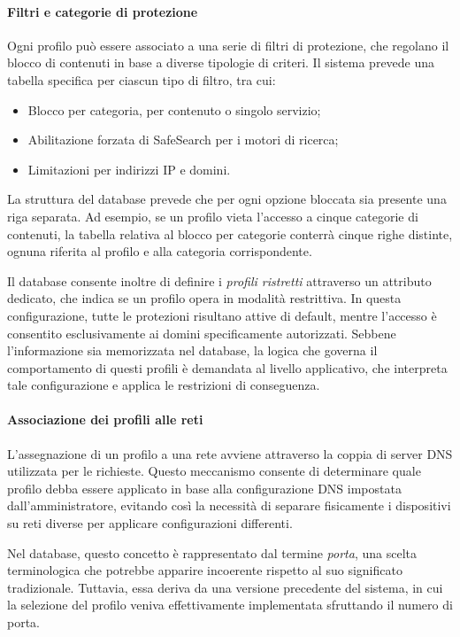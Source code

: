 \paragraph{Filtri e categorie di protezione}
Ogni profilo può essere associato a una serie di filtri di protezione, che regolano il blocco di contenuti in base a diverse tipologie di criteri. Il sistema prevede una tabella specifica per ciascun tipo di filtro, tra cui:
\begin{itemize}
  \item Blocco per categoria, per contenuto o singolo servizio;
  \item Abilitazione forzata di SafeSearch per i motori di ricerca;
  \item Limitazioni per indirizzi IP e domini.
\end{itemize}
La struttura del database prevede che per ogni opzione bloccata sia presente una riga separata. Ad esempio, se un profilo vieta l’accesso a cinque categorie di contenuti, la tabella relativa al blocco per categorie conterrà cinque righe distinte, ognuna riferita al profilo e alla categoria corrispondente.

Il database consente inoltre di definire i \emph{profili ristretti} attraverso un attributo dedicato, che indica se un profilo opera in modalità restrittiva. In questa configurazione, tutte le protezioni risultano attive di default, mentre l’accesso è consentito esclusivamente ai domini specificamente autorizzati. Sebbene l’informazione sia memorizzata nel database, la logica che governa il comportamento di questi profili è demandata al livello applicativo, che interpreta tale configurazione e applica le restrizioni di conseguenza.

\paragraph{Associazione dei profili alle reti}
L’assegnazione di un profilo a una rete avviene attraverso la coppia di server DNS utilizzata per le richieste. Questo meccanismo consente di determinare quale profilo debba essere applicato in base alla configurazione DNS impostata dall’amministratore, evitando così la necessità di separare fisicamente i dispositivi su reti diverse per applicare configurazioni differenti.

Nel database, questo concetto è rappresentato dal termine \emph{porta}, una scelta terminologica che potrebbe apparire incoerente rispetto al suo significato tradizionale. Tuttavia, essa deriva da una versione precedente del sistema, in cui la selezione del profilo veniva effettivamente implementata sfruttando il numero di porta.

